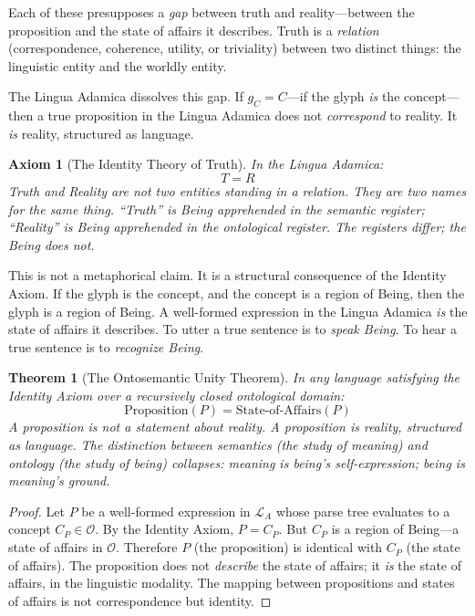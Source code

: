 \documentclass[12pt, letterpaper]{book}
\def\equiv{=}%
\def\mathfrak#1{#1}%
\newtheorem{axiom}{Axiom}[chapter]
\newtheorem{theorem}{Theorem}[chapter]
\begin{document}
Each of these presupposes a \textit{gap} between truth and reality---between the proposition and the state of affairs it describes. Truth is a \textit{relation} (correspondence, coherence, utility, or triviality) between two distinct things: the linguistic entity and the worldly entity.

The Lingua Adamica dissolves this gap. If $\mathfrak{g}_C \equiv C$---if the glyph \textit{is} the concept---then a true proposition in the Lingua Adamica does not \textit{correspond} to reality. It \textit{is} reality, structured as language.

\begin{axiom}[The Identity Theory of Truth]\label{ax:truth-reality}
In the Lingua Adamica:
\[
T \equiv R
\]
Truth and Reality are not two entities standing in a relation. They are two names for the same thing. ``Truth'' is Being apprehended in the semantic register; ``Reality'' is Being apprehended in the ontological register. The registers differ; the Being does not.
\end{axiom}

This is not a metaphorical claim. It is a structural consequence of the Identity Axiom. If the glyph is the concept, and the concept is a region of Being, then the glyph is a region of Being. A well-formed expression in the Lingua Adamica \textit{is} the state of affairs it describes. To utter a true sentence is to \textit{speak Being}. To hear a true sentence is to \textit{recognize Being}.

\begin{theorem}[The Ontosemantic Unity Theorem]\label{thm:ontosemantic}
In any language satisfying the Identity Axiom over a recursively closed ontological domain:
\[
\mathrm{Proposition}(P) \equiv \mathrm{State\text{-}of\text{-}Affairs}(P)
\]
A proposition is not a statement \textit{about} reality. A proposition \textit{is} reality, structured as language. The distinction between semantics (the study of meaning) and ontology (the study of being) collapses: meaning is being's self-expression; being is meaning's ground.
\end{theorem}

\begin{proof}
Let $P$ be a well-formed expression in $\mathcal{L}_A$ whose parse tree evaluates to a concept $C_P \in \mathcal{O}$. By the Identity Axiom, $P \equiv C_P$. But $C_P$ is a region of Being---a state of affairs in $\mathcal{O}$. Therefore $P$ (the proposition) is identical with $C_P$ (the state of affairs). The proposition does not \textit{describe} the state of affairs; it \textit{is} the state of affairs, in the linguistic modality. The mapping between propositions and states of affairs is not correspondence but identity.
\end{proof}
\end{document}

